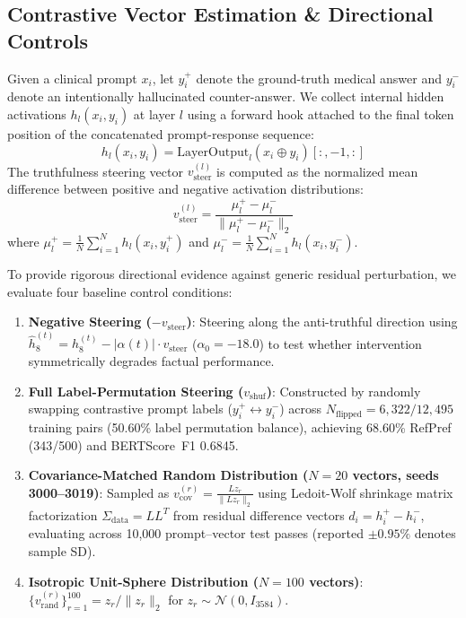 \documentclass[conference]{IEEEtran}
\begin{document}
\subsection{Contrastive Vector Estimation \& Directional Controls}
Given a clinical prompt $x_i$, let $y_i^+$ denote the ground-truth medical answer and $y_i^-$ denote an intentionally hallucinated counter-answer. We collect internal hidden activations $h_l(x_i, y_i)$ at layer $l$ using a forward hook attached to the final token position of the concatenated prompt-response sequence:
\begin{equation}
h_l(x_i, y_i) = \text{LayerOutput}_l(x_i \oplus y_i)[:, -1, :]
\end{equation}
The truthfulness steering vector $v_{\text{steer}}^{(l)}$ is computed as the normalized mean difference between positive and negative activation distributions:
\begin{equation}
v_{\text{steer}}^{(l)} = \frac{\mu_l^+ - \mu_l^-}{\|\mu_l^+ - \mu_l^-\|_2}
\end{equation}
where $\mu_l^+ = \frac{1}{N} \sum_{i=1}^N h_l(x_i, y_i^+)$ and $\mu_l^- = \frac{1}{N} \sum_{i=1}^N h_l(x_i, y_i^-)$.

To provide rigorous directional evidence against generic residual perturbation, we evaluate four baseline control conditions:
\begin{enumerate}
    \item \textbf{Negative Steering ($-v_{\text{steer}}$)}: Steering along the anti-truthful direction using $\hat{h}_8^{(t)} = h_8^{(t)} - |\alpha(t)| \cdot v_{\text{steer}}$ ($\alpha_0=-18.0$) to test whether intervention symmetrically degrades factual performance.
    \item \textbf{Full Label-Permutation Steering ($v_{\text{shuf}}$)}: Constructed by randomly swapping contrastive prompt labels ($y_i^+ \leftrightarrow y_i^-$) across $N_{\text{flipped}}=6,322 / 12,495$ training pairs (50.60\% label permutation balance), achieving 68.60\% RefPref (343/500) and BERTScore~F1 0.6845.
    \item \textbf{Covariance-Matched Random Distribution ($N=20$ vectors, seeds 3000--3019)}: Sampled as $v_{\text{cov}}^{(r)} = \frac{L z_r}{\|L z_r\|_2}$ using Ledoit-Wolf shrinkage matrix factorization $\Sigma_{\text{data}} = L L^T$ from residual difference vectors $d_i = h_i^+ - h_i^-$, evaluating across 10,000 prompt--vector test passes (reported $\pm0.95\%$ denotes sample SD).
    \item \textbf{Isotropic Unit-Sphere Distribution ($N=100$ vectors)}: $\{v_{\text{rand}}^{(r)}\}_{r=1}^{100} = z_r / \|z_r\|_2$ for $z_r \sim \mathcal{N}(0, I_{3584})$.
\end{enumerate}
\end{document}

